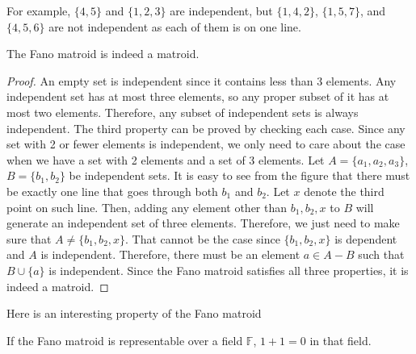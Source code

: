 For example, $\{4, 5\}$ and $\{ 1, 2, 3 \}$ are independent, but $\{ 1, 4, 2 \}$, $\{1, 5, 7\}$, and $\{4, 5, 6 \}$ are not independent as each of them is on one line.

\begin{thm}
The Fano matroid is indeed a matroid.
\end{thm}

\begin{proof}
An empty set is independent since it contains less than 3 elements.
Any independent set has at most three elements, so any proper subset of it has at most two elements.
Therefore, any subset of independent sets is always independent.
The third property can be proved by checking each case.
Since any set with 2 or fewer elements is independent, we only need to care about the case when we have a set with 2 elements and a set of 3 elements.
Let $A = \{ a_1, a_2, a_3 \}$, $B = \{ b_1, b_2\}$ be independent sets.
It is easy to see from the figure that there must be exactly one line that goes through both $b_1$ and $b_2$.
Let $x$ denote the third point on such line.
Then, adding any element other than $b_1, b_2, x$ to $B$ will generate an independent set of three elements.
Therefore, we just need to make sure that $A \neq \{ b_1, b_2, x \}$.
That cannot be the case since $\{ b_1, b_2, x \}$ is dependent and $A$ is independent.
Therefore, there must be an element $a \in A - B$ such that $B \cup \{ a \}$ is independent.
Since the Fano matroid satisfies all three properties, it is indeed a matroid.
\end{proof}


Here is an interesting property of the Fano matroid
\begin{thm}
If the Fano matroid is representable over a field $\mathbb{F}$, $1 + 1 = 0$ in that field.
\end{thm}

